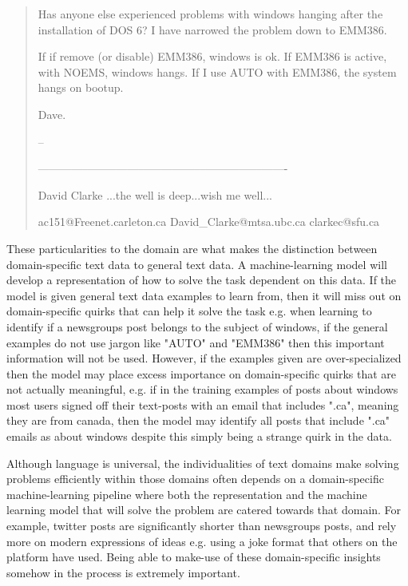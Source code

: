 \begin{quote}
	Has anyone else experienced problems with windows hanging
	after the installation of DOS 6?  I have narrowed the
	problem down to EMM386.
	
	If if remove (or disable) EMM386, windows is ok.  If EMM386
	is active, with NOEMS, windows hangs.  If I use AUTO with
	EMM386, the system hangs on bootup.
	
	Dave.
	
	
	-- 
	
	-------------------------------------------------------------------
	
	David Clarke   ...the well is deep...wish me well...
	
	ac151@Freenet.carleton.ca  David\_Clarke@mtsa.ubc.ca  clarkec@sfu.ca
\end{quote}

These particularities to the domain are what makes the distinction between domain-specific text data to general text data. A machine-learning model will develop a representation of how to solve the task dependent on this data. If the model is given general text data examples to learn from, then it will miss out on domain-specific quirks that can help it solve the task e.g. when learning to identify if a newsgroups post belongs to the subject of windows, if the general examples do not use jargon like "AUTO" and "EMM386" then this important information will not be used. However, if the examples given are over-specialized then the model may place excess importance on domain-specific quirks that are not actually meaningful, e.g. if in the training examples of posts about windows most users signed off their text-posts with an email that includes ".ca", meaning they are from canada, then the model may identify all posts that include ".ca" emails as about windows despite this simply being a strange quirk in the data.

Although language is universal, the individualities of text domains make solving problems efficiently within those domains often depends on a domain-specific machine-learning pipeline where both the representation and the machine learning model that will solve the problem are catered towards that domain. For example, twitter posts are significantly shorter than newsgroups posts, and rely more on modern expressions of ideas e.g. using a joke format that others on the platform have used. Being able to make-use of these domain-specific insights somehow in the process is extremely important. 

